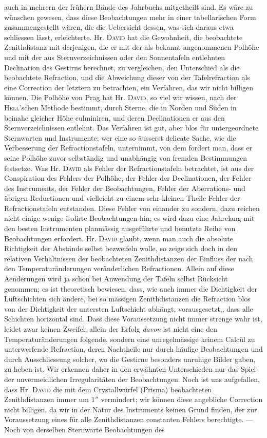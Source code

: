 auch in mehrern der frühern Bände des Jahrbuchs mitgetheilt sind. Es wäre zu wünschen gewesen, dass diese Beobachtungen mehr in einer tabellarischen Form zusammengestellt wären, die die Uebersicht dessen, was sich daraus etwa schliessen lässt, erleichterte. Hr. \textsc{David} hat die Gewohnheit, die beobachtete Zenithdistanz mit derjenigen, die er mit der als bekannt angenommenen Polhöhe und mit der aus Sternverzeichnissen oder den Sonnentafeln entlehnten Declination des Gestirns berechnet, zu vergleichen, den Unterschied als die beobachtete Refraction, und die Abweichung dieser von der Tafelrefraction als eine Correction der letztern zu betrachten, ein Verfahren, das wir nicht billigen können. Die Polhöhe von Prag hat Hr. \textsc{David}, so viel wir wissen, nach der \textsc{Hell}'schen Methode bestimmt, durch Sterne, die in Norden und Süden in beinahe gleicher Höhe culminiren, und deren Declinationen er aus den Sternverzeichnissen entlehnt. Das Verfahren ist gut, aber blos für untergeordnete Sternwarten und Instrumente; wer eine so äusserst delicate Sache, wie die Verbesserung der Refractionstafeln, unternimmt, von dem fordert man, dass er seine Polhöhe zuvor selbständig und unabhängig von fremden Bestimmungen festsetze. Was Hr. \textsc{David} als Fehler der Refractionstafeln betrachtet, ist aus der Conspiration des Fehlers der Polhöhe, der Fehler der Declinationen, der Fehler des Instruments, der Fehler der Beobachtungen, Fehler der Aberrations- und übrigen Reductionen und vielleicht zu einem sehr kleinen Theile Fehler der Refractionstafeln entstanden. Diese Fehler von einander zu sondern, dazu reichen nicht einige wenige isolirte Beobachtungen hin; es wird dazu eine Jahrelang mit den besten Instrumenten planmässig ausgeführte und benutzte Reihe von Beobachtungen erfordert. Hr. \textsc{David} glaubt, wenn man auch die absolute Richtigkeit der Abstände selbst bezweifeln wolle, so zeige sich doch in den relativen Verhältnissen der beobachteten Zenithdistanzen der Einfluss der nach den Temperaturänderungen veränderlichen Refractionen. Allein auf diese Aenderungen wird ja schon bei Anwendung der Tafeln selbst Rücksicht genommen; es ist theoretisch bewiesen, dass, wie auch immer die Dichtigkeit der Luftschichten sich ändere, bei so mässigen Zenithdistanzen die Refraction blos von der Dichtigkeit der untersten Luftschicht abhängt, vorausgesetzt,, dass alle Schichten horizontal sind. Dass diese Voraussetzung nicht immer strenge wahr ist, leidet zwar keinen Zweifel, allein der Erfolg \emph{davon} ist nicht eine den Temperaturänderungen folgende, sondern eine unregelmässige keinem Calcül zu unterwerfende Refraction, deren Nachtheile nur durch häufige Beobachtungen und durch Ausschliessung solcher, wo die Gestirne besonders unruhige Bilder gaben, zu heben ist. Wir erkennen daher in den erwähnten Unterschieden nur das Spiel der unvermeidlichen Irregularitäten der Beobachtungen. Noch ist uns aufgefallen, dass Hr. \textsc{David} die mit dem Crystallwürfel (Prisma) beobachteten Zenithdistanzen immer um $1''$ vermindert; wir können diese angebliche Correction nicht billigen, da wir in der Natur des Instruments keinen Grund finden, der zur Voraussetzung eines für alle Zenithdistanzen constanten Fehlers berechtigte. --- Noch von derselben Sternwarte Beobachtungen des 